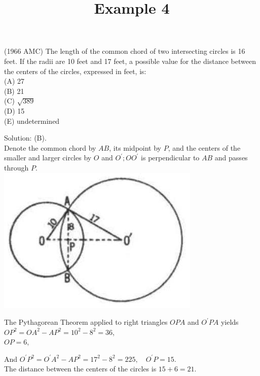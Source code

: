 \documentclass{article}
\title{Example 4}
\date{}
\begin{document}
\maketitle

(1966 AMC) The length of the common chord of two intersecting circles is 16 feet. If the radii are 10 feet and 17 feet, a possible value for the distance between the centers of the circles, expressed in feet, is:\\
(A) 27\\
(B) 21\\
(C) \(\sqrt{389}\)\\
(D) 15\\
(E) undetermined

Solution: (B).\\
Denote the common chord by \(A B\), its midpoint by \(P\), and the centers of the smaller and larger circles by \(O\) and \(O^{\prime} ; O O^{\prime}\) is perpendicular to \(A B\) and passes through \(P\).\\
\centering
\includegraphics[width=\textwidth]{images/177(1).jpg}

The Pythagorean Theorem applied to right triangles \(O P A\) and \(O^{\prime} P A\) yields \(O P^{2}=O A^{2}-A P^{2}=10^{2}-8^{2}=36\),\\
\(O P=6\),


And \(O^{\prime} P^{2}=O^{\prime} A^{2}-A P^{2}=17^{2}-8^{2}=225, \quad O^{\prime} P=15\).\\
The distance between the centers of the circles is \(15+6=21\).
\end{document}
